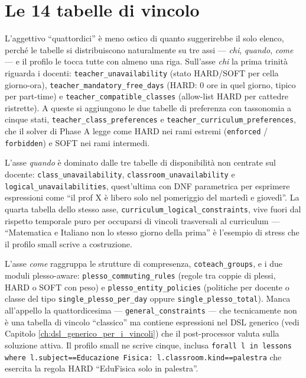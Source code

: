 \section{Le 14 tabelle di vincolo}

L'aggettivo ``quattordici'' \`e meno ostico di quanto suggerirebbe il
solo elenco, perch\'e le tabelle si distribuiscono naturalmente su
tre assi --- \emph{chi}, \emph{quando}, \emph{come} --- e il profilo
le tocca tutte con almeno una riga. Sull'asse \emph{chi} la prima
trinit\`a riguarda i docenti: \texttt{teacher\_unavailability}
(stato HARD/SOFT per cella giorno-ora),
\texttt{teacher\_mandatory\_free\_days} (HARD: 0 ore in quel
giorno, tipico per part-time) e
\texttt{teacher\_compatible\_classes} (allow-list HARD per cattedre
ristrette). A queste si aggiungono le due tabelle di preferenza
con tassonomia a cinque stati,
\texttt{teacher\_class\_preferences} e
\texttt{teacher\_curriculum\_preferences}, che il solver di Phase A
legge come HARD nei rami estremi (\texttt{enforced} / \texttt{forbidden})
e SOFT nei rami intermedi.

L'asse \emph{quando} \`e dominato dalle tre tabelle di disponibilit\`a
non centrate sul docente: \texttt{class\_unavailability},
\texttt{classroom\_unavailability} e
\texttt{logical\_unavailabilities}, quest'ultima con DNF
parametrica per esprimere espressioni come ``il prof X \`e libero
solo nel pomeriggio del marted\`i e gioved\`i''. La quarta tabella
dello stesso asse, \texttt{curriculum\_logical\_constraints}, vive
fuori dal rispetto temporale puro per occuparsi di vincoli
trasversali al curriculum --- ``Matematica e Italiano non lo stesso
giorno della prima'' \`e l'esempio di stress che il profilo small
scrive a costruzione.

L'asse \emph{come} raggruppa le strutture di compresenza,
\texttt{coteach\_groups}, e i due moduli plesso-aware:
\texttt{plesso\_commuting\_rules} (regole tra coppie di plessi,
HARD o SOFT con peso) e \texttt{plesso\_entity\_policies}
(politiche per docente o classe del tipo
\texttt{single\_plesso\_per\_day} oppure \texttt{single\_plesso\_total}).
Manca all'appello la quattordicesima --- \texttt{general\_constraints} ---
che tecnicamente non \`e una tabella di vincolo ``classico'' ma
contiene espressioni nel DSL generico (vedi Capitolo
\ref{ch:dsl_generico_per_i_vincoli}) che il post-processor valuta
sulla soluzione attiva. Il profilo small ne scrive cinque,
inclusa \texttt{forall l in lessons where l.subject==Educazione Fisica:
l.classroom.kind==palestra} che esercita la regola HARD
``EduFisica solo in palestra''.

